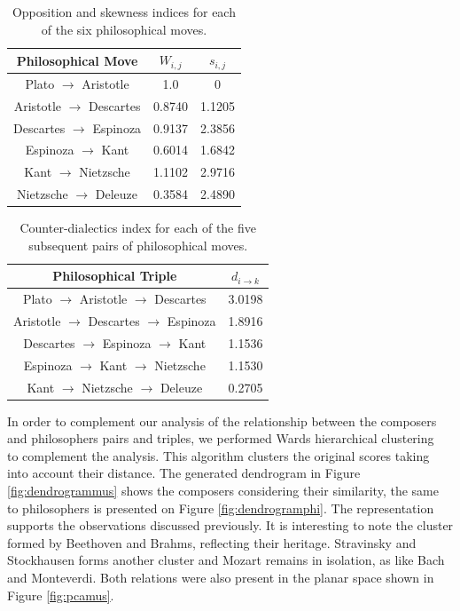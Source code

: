 \documentclass[
 aip,
 jmp,
 amsmath,amssymb,
 reprint,
]{revtex4-1}
\begin{document}
\begin{table}%
\caption{\label{tab:tableOIphi}Opposition and skewness indices for each
of the six philosophical moves.  }

\begin{tabular}{|c||c|c|}
\hline
Philosophical Move & $W_{i,j}$ & $s_{i,j}$ \\
\hline \hline
Plato $\rightarrow$ Aristotle     & 1.0    & 0 \\
Aristotle $\rightarrow$ Descartes & 0.8740 & 1.1205 \\
Descartes $\rightarrow$ Espinoza  & 0.9137 & 2.3856 \\
Espinoza $\rightarrow$ Kant       & 0.6014 & 1.6842 \\
Kant $\rightarrow$ Nietzsche      & 1.1102 & 2.9716 \\
Nietzsche $\rightarrow$ Deleuze   & 0.3584 & 2.4890 \\
\hline
\end{tabular}
\end{table}

\begin{table}%
\caption{\label{tab:tableEphi} Counter-dialectics index for each
of the five subsequent pairs of philosophical moves.  }

\begin{tabular}{|c||c|}
\hline
Philosophical Triple & $d_{i \rightarrow k}$ \\
\hline \hline
Plato $\rightarrow$ Aristotle $\rightarrow$ Descartes    & 3.0198 \\
Aristotle $\rightarrow$ Descartes $\rightarrow$ Espinoza & 1.8916 \\
Descartes $\rightarrow$ Espinoza $\rightarrow$ Kant      & 1.1536 \\
Espinoza $\rightarrow$ Kant $\rightarrow$ Nietzsche      & 1.1530 \\
Kant $\rightarrow$ Nietzsche $\rightarrow$ Deleuze       & 0.2705 \\
\hline
\end{tabular}
\end{table}

In order to complement our analysis of the relationship between the composers and philosophers pairs and triples, we performed Wards hierarchical
clustering~\cite{Ward} to complement the analysis. This algorithm clusters the original scores taking into
account their distance. The generated dendrogram in
Figure \ref{fig:dendrogrammus} shows the composers
considering their similarity, the same to philosophers is presented on Figure \ref{fig:dendrogramphi}. The representation supports the
observations discussed previously. It is interesting to note the cluster
formed by Beethoven and Brahms, reflecting their heritage. Stravinsky
and Stockhausen forms another cluster and Mozart remains in isolation,
as like Bach and Monteverdi. Both relations were also present in the
planar space shown in Figure \ref{fig:pcamus}.
\end{document}
